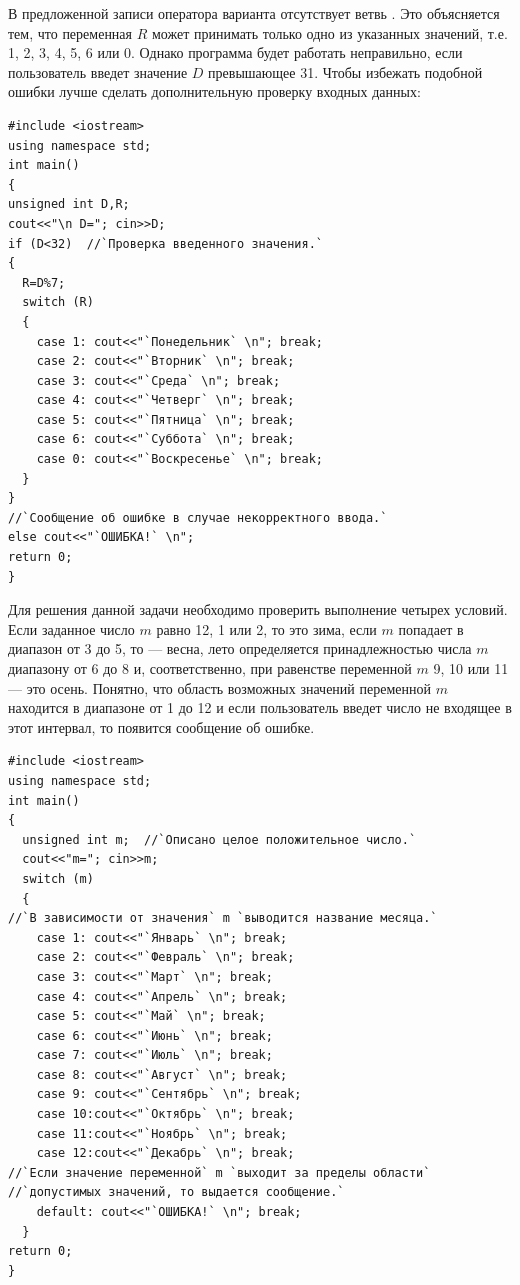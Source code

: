 В предложенной записи оператора варианта отсутствует ветвь . Это объясняется тем, что
переменная $R$ может принимать только одно из указанных значений, т.е. 1, 2, 3, 4, 5, 6 или 0. Однако
программа будет работать неправильно, если пользователь введет значение $D$ превышающее 31. Чтобы
избежать подобной ошибки лучше сделать дополнительную проверку входных данных:
\begin{lstlisting}
#include <iostream>
using namespace std;
int main()
{
unsigned int D,R;
cout<<"\n D="; cin>>D;
if (D<32)  //`Проверка введенного значения.`
{
  R=D%7;
  switch (R)
  {
    case 1: cout<<"`Понедельник` \n"; break;
    case 2: cout<<"`Вторник` \n"; break;
    case 3: cout<<"`Среда` \n"; break;
    case 4: cout<<"`Четверг` \n"; break;
    case 5: cout<<"`Пятница` \n"; break;
    case 6: cout<<"`Суббота` \n"; break;
    case 0: cout<<"`Воскресенье` \n"; break;
  }
}
//`Сообщение об ошибке в случае некорректного ввода.`
else cout<<"`ОШИБКА!` \n";
return 0;
}
\end{lstlisting}


Для решения данной задачи необходимо проверить выполнение четырех условий. Если заданное число $m$
равно 12, 1 или 2, то это зима, если $m$ попадает в диапазон от 3 до 5, то --- весна, лето определяется
принадлежностью числа $m$ диапазону от 6 до 8 и, соответственно, при равенстве переменной
$m$ 9, 10 или 11 --- это осень. Понятно, что область возможных значений переменной $m$
находится в диапазоне от 1 до 12 и если пользователь введет число не входящее в этот интервал, то появится сообщение об
ошибке.
\begin{lstlisting}
#include <iostream>
using namespace std;
int main()
{
  unsigned int m;  //`Описано целое положительное число.`
  cout<<"m="; cin>>m;
  switch (m)
  {
//`В зависимости от значения` m `выводится название месяца.`
    case 1: cout<<"`Январь` \n"; break;
    case 2: cout<<"`Февраль` \n"; break;
    case 3: cout<<"`Март` \n"; break;
    case 4: cout<<"`Апрель` \n"; break;
    case 5: cout<<"`Май` \n"; break;
    case 6: cout<<"`Июнь` \n"; break;
    case 7: cout<<"`Июль` \n"; break;
    case 8: cout<<"`Август` \n"; break;
    case 9: cout<<"`Сентябрь` \n"; break;
    case 10:cout<<"`Октябрь` \n"; break;
    case 11:cout<<"`Ноябрь` \n"; break;
    case 12:cout<<"`Декабрь` \n"; break;
//`Если значение переменной` m `выходит за пределы области`
//`допустимых значений, то выдается сообщение.`
    default: cout<<"`ОШИБКА!` \n"; break;
  }
return 0;
}
\end{lstlisting}

